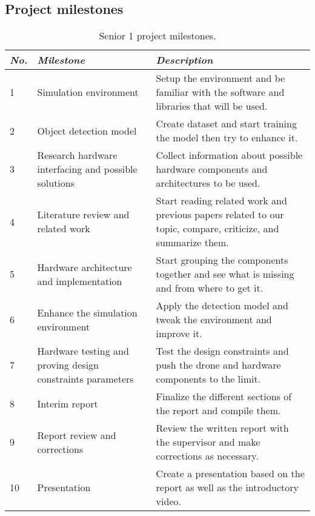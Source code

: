 \documentclass[../main.tex]{subfiles}
\begin{document}
\subsection{Project milestones}

\begin{table}[H]
    \centering
    \caption{Senior 1 project milestones.}
    \label{tab:milestones}
    \begin{tabularx}{\textwidth}{ X p{5cm} p{9cm} }
        \toprule

        \textit{No.} & \textit{Milestone} 
            & \textit{Description}
        \\

        \midrule

        1 & Simulation environment
            & Setup the environment and be familiar with 
            the software and libraries that will be used.
        \\
        2 & Object detection model
            & Create dataset and start training the model 
            then try to enhance it.
        \\
        3 & Research hardware interfacing and possible 
        solutions
            & Collect information about possible hardware 
            components and architectures to be used.
        \\
        4 & Literature review and related work
            & Start reading related work and previous papers 
            related to our topic, compare, criticize, and 
            summarize them.
        \\
        5 & Hardware architecture and implementation
            & Start grouping the components together 
            and see what is missing and from where to get it.
        \\
        6 & Enhance the simulation environment
            & Apply the detection model and tweak 
            the environment and improve it.
        \\
        7 & Hardware testing and proving design constraints 
        parameters
            & Test the design constraints and push the 
            drone and hardware components to the limit.
        \\
        8 & Interim report
            & Finalize the different sections of the report
            and compile them.
        \\
        9 & Report review and corrections
            & Review the written report with the supervisor
            and make corrections as necessary.
        \\
        10 & Presentation
            & Create a presentation based on the report
            as well as the introductory video.
        \\

        \bottomrule
    \end{tabularx}
\end{table}
\end{document}
